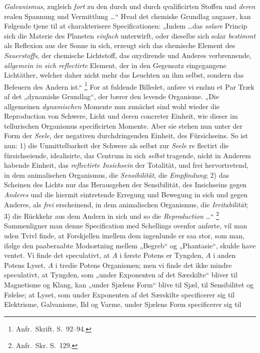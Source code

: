 \documentclass[12pt]{book}
\newcommand{\apage}[1]{\marginnote{\footnotesize\textit{[#1]}}}
\begin{document}
\emph{Galvanismus}, zugleich \emph{fort} zu den durch und durch qvalificirten Stoffen und
\emph{deren} realen Spannung und Vermittlung \ldots“ Hvad det chemiske Grundlag angaaer,
kan Følgende tjene til at charakterisere Specificationen: „Indem \ldots das \emph{solare}
Princip sich die Materie des Planeten \emph{einfach} unterwirft, oder dieselbe sich solar
\emph{bestimmt} als Reflexion aus der Sonne in sich, erzeugt sich das chemische Element des
\emph{Sauerstoffs}, der chemische Lichtstoff, das oxydirende und Anderes verbrennende,
\emph{allgemein in sich reflectirte} Element, der in den Gegensatz eingegangene Lichtäther,
welcher daher nicht mehr das Leuchten an ihm selbst, sondern das Befeuern des Andern
ist.“%
\footnote{Anfr.\ Skrift. S.~92--94.}
For at fuldende Billedet, anføre vi endnu et Par Træk af det „dynamiske Grundlag“, der
bærer den levende Organisme. „Die allgemeinen \emph{dynamischen} Momente nun zunächst sind
wohl wieder die Reproduction von Schwere, Licht und deren concreter Einheit, wie dieser im
tellurischen Organismus specificirten Momente. Aber sie stehen nun unter der Form der
\emph{Seele}, der negativen durchdringenden Einheit, des Fürsichseins. So ist nun: 1) die
Unmittelbarkeit der Schwere als selbst zur \emph{Seele} \apage{359} re\-%
flectirt die fürsichseiende, idealisirte, das Centrum in sich \emph{selbst} tragende, nicht
in Anderem habende Einheit, das \emph{reflectirte Insichsein} der Totalität, und frei
hervortretend, in dem animalischen Organismus, die \emph{Sensibilität}, die
\emph{Empfindung}; 2) das Scheinen des Lichts nur das Herausgehen der Sensibilität, des
Insichseins gegen \emph{Anderes} und die hiermit eintretende Erregung und Bewegung in sich
und gegen Anderes, als \emph{frei} erscheinend, in dem animalischen Organismus, die
\emph{Irritabilität}; 3) die Rückkehr aus dem Andern in sich und so die \emph{Reproduction}
\ldots“%
\footnote{Anfr.\ Skr. S.~129.}
Sammenligner man denne Specification med Schellings ovenfor anførte, vil man uden Tvivl
finde, at Forskjellen imellem dem ingenlunde er saa stor, som man, ifølge den paaberaabte
Modsætning mellem „Begreb“ og „Phantasie“, skulde have ventet. Vi finde det speculativt, at
$A$ i første Potens er Tyngden, $A$ i anden Potens Lyset, $A$ i tredie Potens Organismen;
men vi finde det ikke mindre speculativt, at Tyngden, som „under Exponenten af det
Særskilte“ bliver til Magnetisme og Klang, kan „under Sjælens Form“ blive til Sjæl, til
Sensibilitet og Følelse; at Lyset, som under Exponenten af det Særskilte specificerer sig
til Elektrisme, Galvanisme, Ild og Varme, under Sjælens Form specificerer sig til
\end{document}
